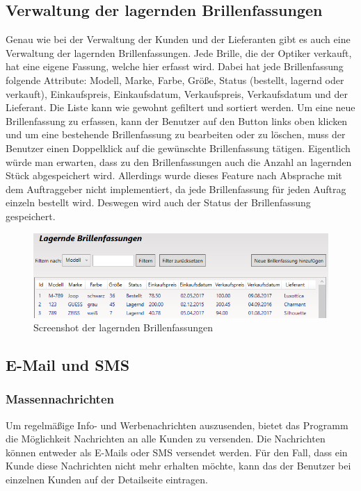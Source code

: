 \subsection{Verwaltung der lagernden Brillenfassungen}
Genau wie bei der Verwaltung der Kunden und der Lieferanten gibt es auch eine Verwaltung der lagernden Brillenfassungen. Jede Brille, die der Optiker verkauft, hat eine eigene Fassung, welche hier erfasst wird. Dabei hat jede Brillenfassung folgende Attribute: Modell, Marke, Farbe, Größe, Status (bestellt, lagernd oder verkauft), Einkaufspreis, Einkaufsdatum, Verkaufspreis, Verkaufsdatum und der Lieferant. Die Liste kann wie gewohnt gefiltert und sortiert werden. Um eine neue Brillenfassung zu erfassen, kann der Benutzer auf den Button links oben klicken und um eine bestehende Brillenfassung zu bearbeiten oder zu löschen, muss der Benutzer einen Doppelklick auf die gewünschte Brillenfassung tätigen.
\newline Eigentlich würde man erwarten, dass zu den Brillenfassungen auch die Anzahl an lagernden Stück abgespeichert wird. Allerdings wurde dieses Feature nach Absprache mit dem Auftraggeber nicht implementiert, da jede Brillenfassung für jeden Auftrag einzeln bestellt wird. Deswegen wird auch der Status der Brillenfassung gespeichert. \bigskip
\begin{figure}[H]
\begin{center}
	\includegraphics[scale=.75]{images/Brillenfassungen.png}
\end{center}
	\caption{Screenshot der lagernden Brillenfassungen}
	\label{fig:sample}
\end{figure}
\bigskip
\subsection{E-Mail und SMS} \medskip
\subsubsection{Massennachrichten}
Um regelmäßige Info- und Werbenachrichten auszusenden, bietet das Programm die Möglichkeit Nachrichten an alle Kunden zu versenden. Die Nachrichten können entweder als E-Mails oder SMS versendet werden. Für den Fall, dass ein Kunde diese Nachrichten nicht mehr erhalten möchte, kann das der Benutzer bei einzelnen Kunden auf der Detailseite eintragen.
